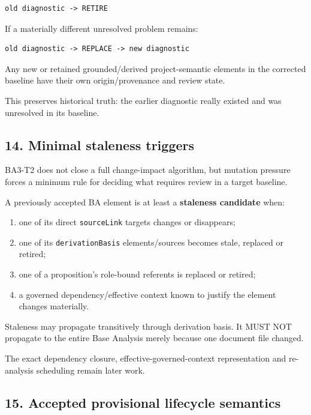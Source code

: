 \documentclass[11pt,a4paper]{article}
\providecommand{\tightlist}{\setlength{\itemsep}{0pt}\setlength{\parskip}{0pt}}\setlength{\emergencystretch}{4em}\hbadness=10000\hfuzz=20pt\sloppy
\begin{document}
\begin{verbatim}
old diagnostic -> RETIRE
\end{verbatim}

If a materially different unresolved problem remains:

\begin{verbatim}
old diagnostic -> REPLACE -> new diagnostic
\end{verbatim}

Any new or retained grounded/derived project-semantic elements in the
corrected baseline have their own origin/provenance and review state.

This preserves historical truth: the earlier diagnostic really existed
and was unresolved in its baseline.

\subsection{14. Minimal staleness
triggers}\label{minimal-staleness-triggers}

BA3-T2 does not close a full change-impact algorithm, but mutation
pressure forces a minimum rule for deciding what requires review in a
target baseline.

A previously accepted BA element is at least a \textbf{staleness
candidate} when:

\begin{enumerate}
\def\labelenumi{\arabic{enumi}.}
\tightlist
\item
  one of its direct \texttt{sourceLink} targets changes or disappears;
\item
  one of its \texttt{derivationBasis} elements/sources becomes stale,
  replaced or retired;
\item
  one of a proposition's role-bound referents is replaced or retired;
\item
  a governed dependency/effective context known to justify the element
  changes materially.
\end{enumerate}

Staleness may propagate transitively through derivation basis. It MUST
NOT propagate to the entire Base Analysis merely because one document
file changed.

The exact dependency closure, effective-governed-context representation
and re-analysis scheduling remain later work.

\subsection{15. Accepted provisional lifecycle
semantics}\label{accepted-provisional-lifecycle-semantics}
\end{document}
